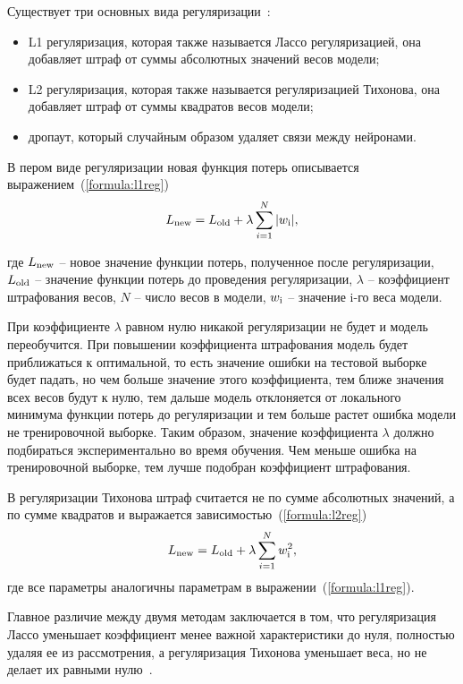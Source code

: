 Существует три основных вида регуляризации~\cite{regulisation}:
\begin{itemize}
	\item L1 регуляризация, которая также называется Лассо регуляризацией, она добавляет штраф от суммы абсолютных значений весов модели;
	\item L2 регуляризация, которая также называется регуляризацией Тихонова, она добавляет штраф от суммы квадратов весов модели;
	\item дропаут, который случайным образом удаляет связи между нейронами.
\end{itemize}

В пером виде регуляризации новая функция потерь описывается выражением~(\ref{formula:l1reg})
\begin{equation}\label{formula:l1reg}
L_{\rm{new}} = L_{\rm{old}} + \lambda\sum\limits_{i=1}^{N}|w_{\rm{i}}|,
\end{equation}

где $L_{\rm{new}}$ -- новое значение функции потерь, полученное после регуляризации, $L_{\rm{old}}$ -- значение функции потерь до проведения регуляризации, $\lambda$ -- коэффициент штрафования весов, $N$ -- число весов в модели, $w_{\rm{i}}$ -- значение i-го веса модели.

При коэффициенте $\lambda$ равном нулю никакой регуляризации не будет и модель переобучится. При повышении коэффициента штрафования модель будет приближаться к оптимальной, то есть значение ошибки на тестовой выборке будет падать, но чем больше значение этого коэффициента, тем ближе значения всех весов будут к нулю, тем дальше модель отклоняется от локального минимума функции потерь до регуляризации и тем больше растет ошибка модели не тренировочной выборке. Таким образом, значение коэффициента $\lambda$ должно подбираться экспериментально во время обучения. Чем меньше ошибка на тренировочной выборке, тем лучше подобран коэффициент штрафования.

В регуляризации Тихонова штраф считается не по сумме абсолютных значений, а по сумме квадратов и выражается зависимостью~(\ref{formula:l2reg})
\begin{equation}\label{formula:l2reg}
L_{\rm{new}} = L_{\rm{old}} + \lambda\sum\limits_{i=1}^{N}w_{\rm{i}}^2,
\end{equation}
где все параметры аналогичны параметрам в выражении~(\ref{formula:l1reg}).

Главное различие между двумя методам заключается в том, что регуляризация Лассо уменьшает коэффициент менее важной характеристики до нуля, полностью удаляя ее из рассмотрения, а регуляризация Тихонова уменьшает веса, но не делает их равными нулю~\cite{regulisation}.

